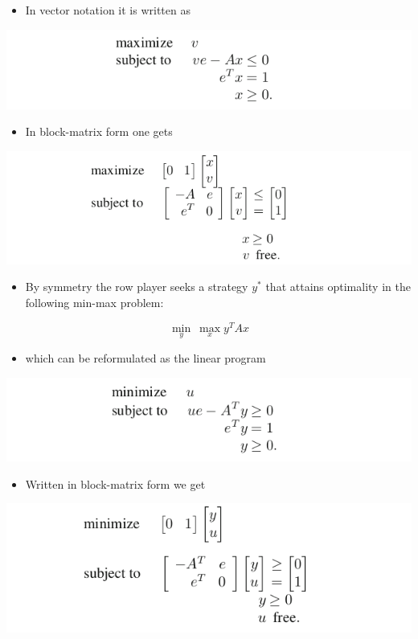 \documentclass[11pt]{article}
\begin{document}
\begin{itemize}
\item In vector notation it is written as
\end{itemize}
\begin{center}
\includegraphics[width=.9\linewidth]{Game Theory/screenshot_2019-02-11_15-25-41.png}
\end{center}
\begin{itemize}
\item In block-matrix form one gets
\end{itemize}
\begin{center}
\includegraphics[width=.9\linewidth]{Game Theory/screenshot_2019-02-11_15-26-42.png}
\end{center}

\begin{itemize}
\item By symmetry the row player seeks a strategy \(y^*\) that attains optimality in the following min-max problem:
\end{itemize}
\begin{equation*}
  \min_y \ \max_x y^TAx
\end{equation*}
\begin{itemize}
\item which can be reformulated as the linear program
\end{itemize}
\begin{center}
\includegraphics[width=.9\linewidth]{Game Theory/screenshot_2019-02-11_15-28-56.png}
\end{center}
\begin{itemize}
\item Written in block-matrix form we get
\end{itemize}
\begin{center}
\includegraphics[width=.9\linewidth]{Game Theory/screenshot_2019-02-11_15-29-44.png}
\end{center} 
\end{document}
